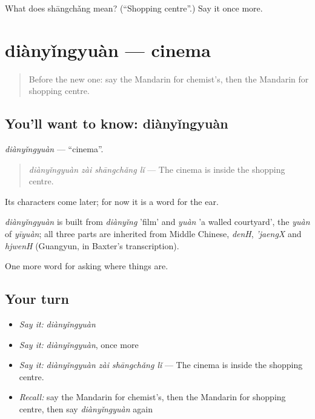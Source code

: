 \begin{tcolorbox}[breakable,colback=teal!4,colframe=teal!35!black,title={Before you move on}]
What does shāngchǎng mean? (\textquotedblleft{}Shopping centre\textquotedblright{}.) Say it once more.
\end{tcolorbox}
\section[diànyǐngyuàn]{diànyǐngyuàn — cinema}

\label{lesson:ZH-C190-dianyingyuan}



\begin{quote}
Before the new one: say the Mandarin for chemist's, then the Mandarin for shopping centre.
\end{quote}

\subsection*{You'll want to know: diànyǐngyuàn}
\emph{diànyǐngyuàn} — \textquotedblleft{}cinema\textquotedblright{}.

\begin{quote}
\emph{diànyǐngyuàn zài shāngchǎng lǐ} — The cinema is inside the shopping centre.
\end{quote}

Its characters come later; for now it is a word for the ear.

\begin{cousinweb}
\emph{diànyǐngyuàn} is built from \emph{diànyǐng} 'film' and \emph{yuàn} 'a walled courtyard', the \emph{yuàn} of \emph{yīyuàn}; all three parts are inherited from Middle Chinese, \emph{denH}, \emph{'jaengX} and \emph{hjwenH} (Guangyun, in Baxter's transcription).
\end{cousinweb}

\begin{grammarlens}[title={What you've built}]
One more word for asking where things are.
\end{grammarlens}

\subsection*{Your turn}
\begin{itemize}
\raggedright
  \item \emph{Say it:} \emph{diànyǐngyuàn}
  \item \emph{Say it:} \emph{diànyǐngyuàn}, once more
  \item \emph{Say it:} \emph{diànyǐngyuàn zài shāngchǎng lǐ} — The cinema is inside the shopping centre.
  \item \emph{Recall:} say the Mandarin for chemist's, then the Mandarin for shopping centre, then say \emph{diànyǐngyuàn} again
\end{itemize}

